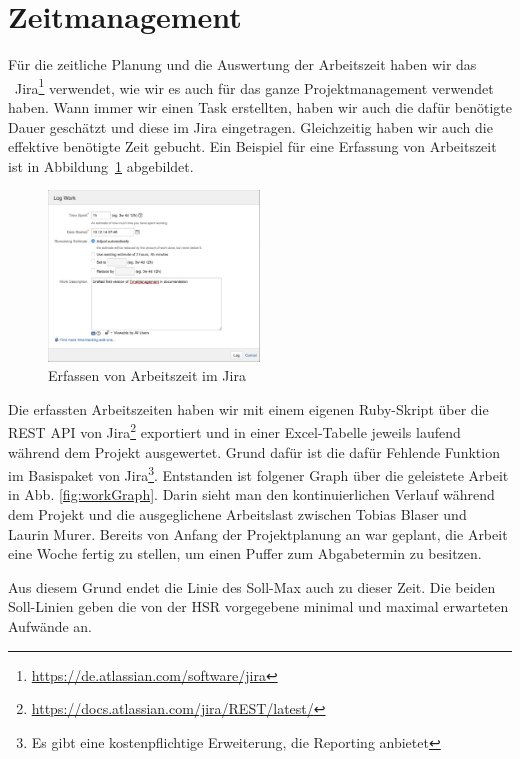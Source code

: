 \chapter*{Zeitmanagement}
	Für die zeitliche Planung und die Auswertung der Arbeitszeit haben wir das \ppt\ Jira\footnote{\url{https://de.atlassian.com/software/jira}} verwendet,
	wie wir es auch für das ganze Projektmanagement verwendet haben.
	Wann immer wir einen Task erstellten, haben wir auch die dafür benötigte Dauer geschätzt
	und diese im Jira eingetragen.
	Gleichzeitig haben wir auch die effektive benötigte Zeit gebucht.
	Ein Beispiel für eine Erfassung von Arbeitszeit ist in Abbildung\ \ref{fig:logWork} abgebildet.
	
	\begin{figure}[H]
		\includegraphics[width=0.5\textwidth]{projectPlan/media/img/logWork.png}
		\centering
		\caption{Erfassen von Arbeitszeit im Jira}
		\label{fig:logWork}
	\end{figure}
	
	Die erfassten Arbeitszeiten haben wir mit einem eigenen Ruby-Skript über die REST API von Jira\footnote{\url{https://docs.atlassian.com/jira/REST/latest/}} exportiert
	und in einer Excel-Tabelle jeweils laufend während dem Projekt ausgewertet.
	Grund dafür ist die dafür Fehlende Funktion im Basispaket von Jira\footnote{Es gibt eine kostenpflichtige Erweiterung, die Reporting anbietet}.
	Entstanden ist folgener Graph über die geleistete Arbeit in Abb.  \ref{fig:workGraph}.
	Darin sieht man den kontinuierlichen Verlauf während dem Projekt
	und die ausgeglichene Arbeitslast zwischen Tobias Blaser und Laurin Murer.
	Bereits von Anfang der Projektplanung an war geplant, die Arbeit eine Woche fertig zu stellen, um einen Puffer zum Abgabetermin zu besitzen.
	
	Aus diesem Grund endet die Linie des Soll-Max auch zu dieser Zeit.
	Die beiden Soll-Linien geben die von der HSR vorgegebene minimal und maximal erwarteten Aufwände an.
	
